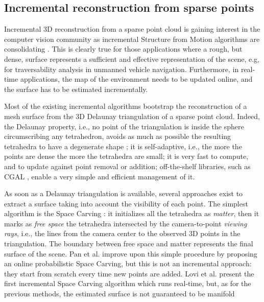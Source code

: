 \subsection{Incremental reconstruction from sparse points}
Incremental 3D reconstruction from a sparse point cloud is gaining interest in the computer vision community as incremental Structure from Motion algorithms are consolidating  \cite{wu13}. 
This is clearly true for those applications where a rough, but dense, surface represents a sufficient and effective representation of the scene, e.g, for traversability analysis in unmanned vehicle navigation. 
Furthermore, in real-time applications, the map of the environment needs to be updated online, and the surface has to be estimated incrementally. 

Most of the existing incremental algorithms \cite{Lovi_et_al_11,Pan_et_al09,litvinov_lhuillier_13,litvinov_Lhiuller14} bootstrap the reconstruction of a mesh surface from the 3D Delaunay triangulation of a sparse point cloud. Indeed, the Delaunay property, i.e., no point of the triangulation is inside the sphere circumscribing any tetrahedron, avoids as much as possible the resulting tetrahedra to have a degenerate shape \cite{Maur_02}; it is self-adaptive, i.e., the more the points are dense the more the tetrahedra are small; it is very fast to compute, and to  update against point removal or addition; off-the-shelf libraries, such as CGAL \cite{cgal}, enable a very simple and efficient management of it. 

As soon as a Delaunay triangulation is available, several approaches exist to extract a surface taking into account the visibility of each point. 
The simplest algorithm is the Space Carving \cite{kutulakos_seitz05}: it initializes all the tetrahedra as \emph{matter}, then it marks as \emph{free space} the tetrahedra intersected by the camera-to-point \emph{viewing rays}, i.e., the lines from the camera center to the observed 3D points in the triangulation. 
The boundary between free space and matter represents the final surface of the scene.
Pan et al. \cite{Pan_et_al09} improve upon this simple procedure by proposing an online probabilistic Space Carving, but this is not an incremental approach: they start from scratch every time new points are added.
Lovi et al. \cite{Lovi_et_al_11} present the first incremental Space Carving algorithm which runs real-time, but, as for the previous methods, the estimated surface is not guaranteed to be manifold 

